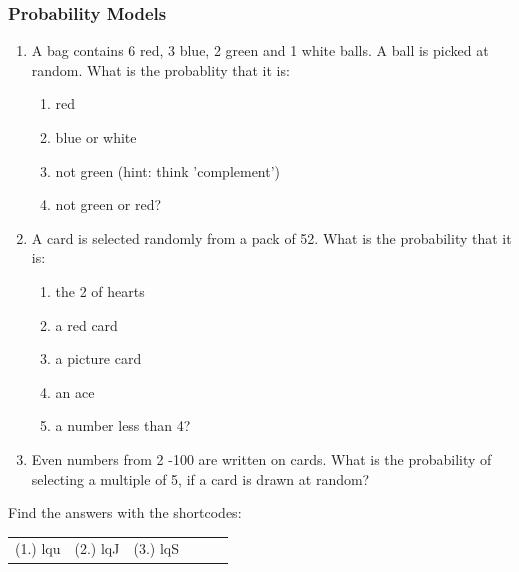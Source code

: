             \subsubsection{  Probability Models
}
            \nopagebreak
        \label{m39377*id112273}\begin{enumerate}[noitemsep, label=\textbf{\arabic*}. ] 
            \label{m39377*uid42}\item A bag contains 6 red, 3 blue, 2 green and 1 white balls. A ball is
picked at random. What is the probablity that it is:
\label{m39377*id112289}\begin{enumerate}[noitemsep, label=\textbf{\alph*}. ] 
            \label{m39377*uid43}\item red
\label{m39377*uid44}\item blue or white
\label{m39377*uid45}\item not green (hint: think 'complement')
\label{m39377*uid46}\item not green or red?
\end{enumerate}
                \label{m39377*uid47}\item A card is selected randomly from a pack of 52. What
is the probability that it is:
\label{m39377*id112354}\begin{enumerate}[noitemsep, label=\textbf{\alph*}. ] 
            \label{m39377*uid48}\item the 2 of hearts
\label{m39377*uid49}\item a red card
\label{m39377*uid50}\item a picture card
\label{m39377*uid51}\item an ace
\label{m39377*uid52}\item a number less than 4?
\end{enumerate}
                \label{m39377*uid53}\item Even numbers from 2 -100 are written on cards. What
is the probability of selecting a multiple of 5, if a card is drawn at
random?\newline
\end{enumerate}
  \label{m39377*cid7}
\par {} Find the answers with the shortcodes:
 \par \begin{tabular}[h]{cccccc}
 (1.) lqu  &  (2.) lqJ  &  (3.) lqS  & \end{tabular}
